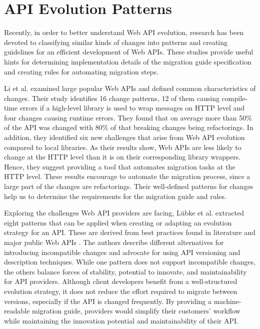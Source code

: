 \section{API Evolution Patterns}
\label{sec:APIEvolutionPatterns}

Recently, in order to better understand Web API evolution, research has been devoted to classifying similar kinds of changes into patterns and creating guidelines for an efficient development of Web APIs. These studies provide useful hints for determining implementation details of the migration guide specification and creating rules for automating migration steps.

Li et al. \cite{li_how_2013} examined large popular Web APIs and defined common characteristics of changes. Their study identifies 16 change patterns, 12 of them causing compile-time errors if a high-level library is used to wrap messages on HTTP level and four changes causing runtime errors. They found that on average more than 50\% of the API was changed with 80\% of that breaking changes being refactorings. In addition, they identified six new challenges that arise from Web API evolution compared to local libraries. As their results show, Web APIs are less likely to change at the HTTP level than it is on their corresponding library wrappers. Hence, they suggest providing a tool that automates migration tasks at the HTTP level. These results encourage to automate the migration process, since a large part of the changes are refactorings. Their well-defined patterns for changes help us to determine the requirements for the migration guide and rules.

Exploring the challenges Web API providers are facing, Lübke et al. \cite{lubke_interface_2019} extracted eight patterns that can be applied when creating or adapting an evolution strategy for an API. These are derived from best practices found in literature and major public Web APIs \cite{lubke_interface_2019}. The authors describe different alternatives for introducing incompatible changes and advocate for using API versioning and description techniques. While one pattern does not support incompatible changes, the others balance forces of stability, potential to innovate, and maintainability for API providers. Although client developers benefit from a well-structured evolution strategy, it does not reduce the effort required to migrate between versions, especially if the API is changed frequently. By providing a machine-readable migration guide, providers would simplify their customers' workflow while maintaining the innovation potential and maintainability of their API.